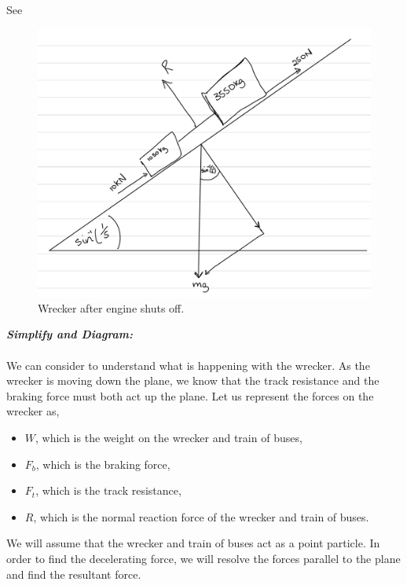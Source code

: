 \begin{subquestions}
\begin{subsubquestions}
See 
\begin{figure}[H]
	\begin{center}
		\includegraphics[scale=0.25]{../2016/figures/2016q5-3}
		\caption{\label{2016:q5:Diagram2} Wrecker after engine shuts off.}
	\end{center}
\end{figure}


\subsubquestion

\textbf{\textit{Simplify and Diagram:}} \\ \\
We can consider  to understand what is happening with the wrecker. As the wrecker is moving down the plane, we know that the track resistance and the braking force must both act up the plane. Let us represent the forces on the wrecker as,
\begin{itemize}
	\item $W$, which is the weight on the wrecker and train of buses,
	\item $F_b$, which is the braking force, 
	\item $F_t$, which is the track resistance,
	\item $R$, which is the normal reaction force of the wrecker and train of buses.
\end{itemize}
We will assume that the wrecker and train of buses act as a point particle. In order to find the decelerating force, we will resolve the forces parallel to the plane and find the resultant force.





\end{subsubquestions}
\end{subquestions}
